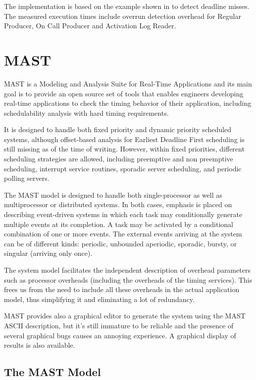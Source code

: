\documentclass{article}
\begin{document}
The implementation is based on the example shown in \cite{overrundetection} to detect deadline misses. The measured execution times include overrun detection overhead for Regular Producer, On Call Producer and Activation Log Reader.

\section{MAST}

MAST \cite{mast} is a Modeling and Analysis Suite for Real-Time Applications and its main goal is to provide an open source set of tools that enables engineers developing real-time applications to check the timing behavior of their application, including schedulability analysis with hard timing requirements.

It is designed to handle both fixed priority and dynamic priority scheduled systems, although offset-based analysis for Earliest Deadline First scheduling is still missing as of the time of writing. However, within fixed priorities, different scheduling strategies are allowed, including preemptive and non preemptive scheduling, interrupt service routines, sporadic server scheduling, and periodic polling servers.

The MAST model is designed to handle both single-processor as well as multiprocessor or distributed systems. In both cases, emphasis is placed on describing event-driven systems in which each task may conditionally generate multiple events at its completion. A task may be activated by a conditional combination of one or more events. The external events arriving at the system can be of different kinds: periodic, unbounded aperiodic, sporadic, bursty, or singular (arriving only once).

The system model facilitates the independent description of overhead parameters such as processor overheads (including the overheads of the timing services). This frees us from the need to include all these overheads in the actual application model, thus simplifying it and eliminating a lot of redundancy.

MAST provides also a graphical editor to generate the system using the MAST ASCII description, but it's still immature to be reliable and the presence of several graphical bugs causes an annoying experience. A graphical display of results is also available.

\subsection{The MAST Model}
\end{document}
